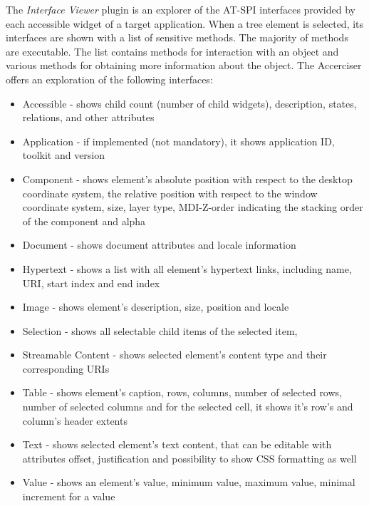 The \textit{Interface Viewer} plugin is an explorer of the AT-SPI interfaces provided by each accessible widget of a target application. When a tree element is selected, its interfaces are shown with a list of sensitive methods. The majority of methods are executable. The list contains methods for interaction with an object and various methods for obtaining more information about the object. The Accerciser offers an exploration of the following interfaces:
\begin{itemize}
    \item Accessible - shows child count (number of child widgets), description, states, relations, and other attributes
    \item Application - if implemented (not mandatory), it shows application ID, toolkit and version
    \item Component - shows element's absolute position with respect to the desktop coordinate system, the relative position with respect to the  window coordinate system, size, layer type, MDI-Z-order indicating the stacking order of the component and alpha
    \item Document - shows document attributes and locale information
    \item Hypertext - shows a list with all element's hypertext links,  including name, URI, start index and end index
    \item Image - shows element's description, size, position and locale
    \item Selection - shows all selectable child items of the selected item,
    \item Streamable Content - shows selected element's content type and their corresponding URIs
    \item Table - shows element's caption, rows, columns, number of selected rows, number of selected columns and for the selected cell, it shows  it's row's and column's header extents  
    \item Text - shows selected element's text content, that can be editable with attributes offset, justification  and possibility to show CSS formatting as well
    \item Value - shows an element's value, minimum value, maximum value, minimal increment for a value 
\end{itemize}

